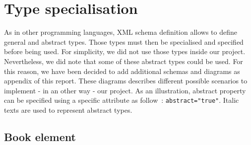 \documentclass{article}
\begin{document}
\section{Type specialisation}
As in other programming languages, XML schema definition allows to define general and abstract types. Those types must then be specialised and specified before being used. For simplicity, we did not use those types inside our project. Nevertheless, we did note that some of these abstract types could be used. For this reason, we have been decided to add additional schemas and diagrams as appendix of this report. These diagrams describes different possible scenarios to implement - in an other way - our project. As an illustration, abstract property can be specified using a specific attribute as follow~: \verb|abstract="true"|. Italic texts are used to represent abstract types.
  
   \subsection{Book element}
    \begin{center}
    \end{center}
    
\end{document}
